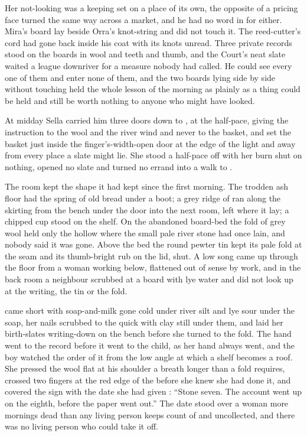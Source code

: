 Her not-looking was a keeping set on a place of its own, the opposite of a pricing face turned the same way across a market, and he had no word in  for either. Mira's board lay beside Orra's knot-string and did not touch it. The reed-cutter's cord had gone back inside his coat with its knots unread. Three private records stood on the boards in wool and teeth and thumb, and the Court's neat slate waited a league downriver for a measure nobody had called. He could see every one of them and enter none of them, and the two boards lying side by side without touching held the whole lesson of the morning as plainly as a thing could be held and still be worth nothing to anyone who might have looked.

\scenebreak

At midday Sella carried him three doors down to , at the half-pace, giving the instruction to the wool and the river wind and never to the basket, and set the basket just inside the finger's-width-open door at the edge of the light and away from every place a slate might lie. She stood a half-pace off with her burn shut on nothing, opened no slate and turned no errand into a walk to .

The room kept the shape it had kept since the first morning. The trodden ash floor had the spring of old bread under a boot; a grey ridge of  ran along the skirting from the bench under the door into the next room, left where it lay; a chipped cup stood on the shelf. On the abandoned board-bed the fold of grey wool held only the hollow where the small pale river stone had once lain, and nobody said it was gone. Above the bed the round pewter tin kept its pale fold at the seam and its thumb-bright rub on the lid, shut. A low song came up through the floor from a woman working below, flattened out of sense by work, and in the back room a neighbour scrubbed at a board with lye water and did not look up at the writing, the tin or the fold.

 came short with soap-and-milk gone cold under river silt and lye sour under the soap, her nails scrubbed to the quick with clay still under them, and laid her birth-slates writing-down on the bench before she turned to the fold. The hand went to the record before it went to the child, as her hand always went, and the boy watched the order of it from the low angle at which a shelf becomes a roof. She pressed the wool flat at his shoulder a breath longer than a fold requires, crossed two fingers at the red edge of the  before she knew she had done it, and covered the sign with the date she had given : “Stone seven. The account went up on the eighth, before the paper went out.” The date stood over a woman more mornings dead than any living person keeps count of and uncollected, and there was no living person who could take it off.


